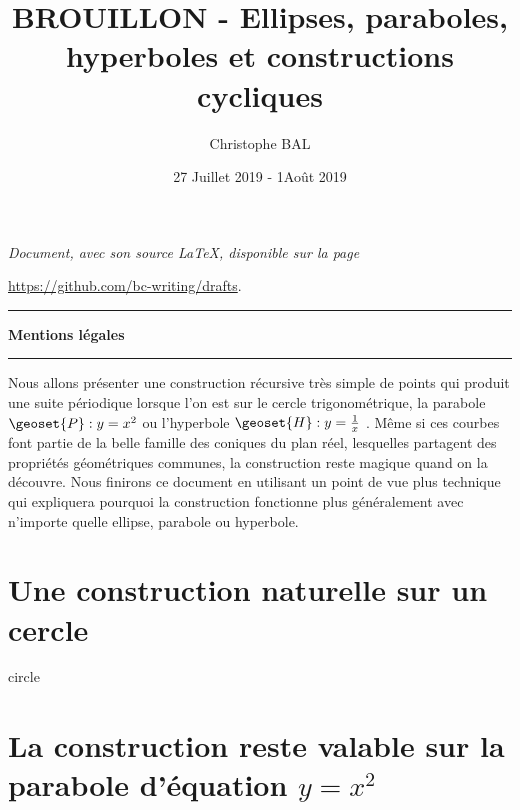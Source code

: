 \documentclass[12pt]{amsart}
\begin{document}
\title{BROUILLON - Ellipses, paraboles, hyperboles et constructions cycliques}
\author{Christophe BAL}
\date{27 Juillet 2019 - 1\ier Août 2019}

\maketitle

\begin{center}
	\itshape
	Document, avec son source \LaTeX, disponible sur la page
	
	\url{https://github.com/bc-writing/drafts}.
\end{center}


\bigskip


\begin{center}
	\hrule\vspace{.3em}
	{
		\fontsize{1.35em}{1em}\selectfont
		\textbf{Mentions \og légales \fg}
	}
			
	\vspace{0.45em}
	\doclicenseThis
	\hrule
\end{center}


\setcounter{tocdepth}{2}
\tableofcontents


Nous allons présenter une construction récursive très simple de points qui produit une suite périodique lorsque l'on est sur le cercle trigonométrique, la parabole $\geoset{P} : y = x^2$ ou l'hyperbole $\geoset{H} : y = \frac{1}{x}$ .
Même si ces courbes font partie de la belle famille des coniques du plan réel, lesquelles partagent des propriétés géométriques communes, la construction reste magique quand on la découvre.
Nous finirons ce document en utilisant un point de vue plus technique qui expliquera pourquoi la construction fonctionne plus généralement avec n'importe quelle ellipse, parabole ou hyperbole. 




\section{Une construction naturelle sur un cercle}
\label{circle}

{circle}




\section{\texorpdfstring{La construction reste valable sur la parabole d'équation $y = x^2$}%
                        {La construction reste valable sur la parabole d'équation y = x**2}}
\label{parabola}
\end{document}
